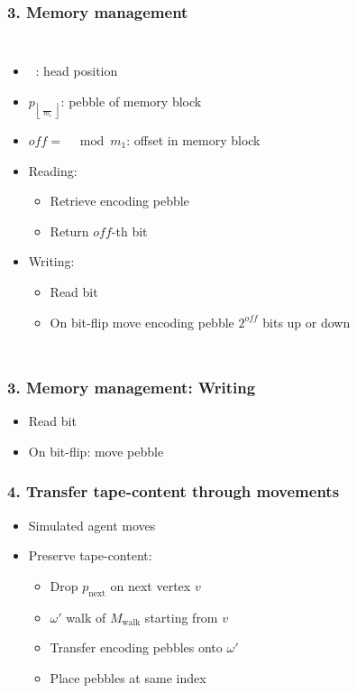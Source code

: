 \documentclass{beamer}
\DeclareMathOperator{\Thead}{T_{\text{head}}}
\begin{document}
\begin{frame}
  \frametitle{3. Memory management}
  \begin{columns}
    \begin{itemize}
      \item $\Thead$: head position
      \item $p_{\left\lfloor\frac{\Thead}{m_{1}}\right\rfloor}$: pebble of
        memory block
      \item $\mathit{off} = \Thead\mod m_{1}$: offset in memory block
      \item Reading:
        \begin{itemize}
          \item Retrieve encoding pebble
          \item Return $\mathit{off}$-th bit
        \end{itemize}
      \item Writing:
        \begin{itemize}
          \item Read bit
          \item On bit-flip move encoding pebble $2^{\mathit{off}}$ bits up or
            down
        \end{itemize}
    \end{itemize}
    \resizebox{\textwidth}{!}{}
    \resizebox{\textwidth}{!}{}
  \end{columns}
\end{frame}

\begin{frame}
  \frametitle{3. Memory management: Writing}
  \begin{itemize}
    \item Read bit
    \item On bit-flip: move pebble
  \end{itemize}
  \resizebox{\textwidth}{!}{}
\end{frame}

\begin{frame}
  \frametitle{4. Transfer tape-content through movements}
  \begin{itemize}
    \item Simulated agent moves
    \item Preserve tape-content:
      \begin{itemize}
        \item Drop $p_{\text{next}}$ on next vertex $v$
        \item $\omega'$ walk of $M_{\text{walk}}$ starting from $v$
        \item Transfer encoding pebbles onto $\omega'$
        \item Place pebbles at same index
      \end{itemize}
  \end{itemize}
\end{frame}
\end{document}
